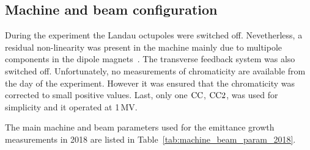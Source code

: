 \subsection{Machine and beam configuration}
During the experiment the Landau octupoles were switched off. Nevetherless, a residual non-linearity was present in the machine mainly due to multipole components in the dipole magnets~\cite{Carlà:2664976, Alekou:2640326}. The transverse feedback system was also switched off. Unfortunately, no measurements of chromaticity are available from the day of the experiment. However it was ensured that the chromaticity was corrected to small positive values. Last, only one ${\mathrm{CC}}$, ${\mathrm{CC}} 2$, was used for simplicity and it operated at 1\,MV.

The main machine and beam parameters used for the emittance growth measurements in 2018 are listed in Table~\ref{tab:machine_beam_param_2018}. %


